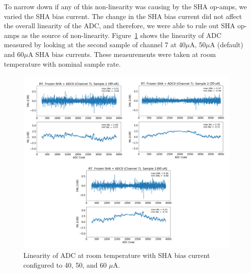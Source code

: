 To narrow down if any of this non-linearity was causing by the SHA op-amps, we varied the SHA bias current. The change in the SHA bias current did not affect the overall linearity of the ADC, and therefore, we were able to rule out SHA op-amps as the source of non-linearity. Figure~\ref{fig:linearity_sha_current} shows the linearity of ADC measured by looking at the second sample of channel 7 at 40$\mu$A, 50$\mu$A (default) and 60$\mu$A SHA bias currents. These measurements were taken at room temperature with nominal sample rate. 
\begin{figure}[h!]
\centering
  \includegraphics[width=1.0\linewidth]{figures/prakash_fig/linearity_sha_current.png}
  \caption{Linearity of ADC at room temperature with SHA bias current configured to 40, 50, and 60 $\mu$A.}
  \label{fig:linearity_sha_current}
\end{figure}

